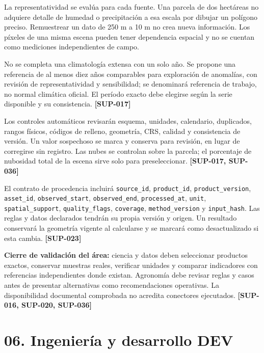 \documentclass[10pt,a4paper]{article}
\begin{document}
La representatividad se evalúa para cada fuente. Una parcela de dos hectáreas no adquiere detalle de humedad o precipitación a esa escala por dibujar un polígono preciso. Remuestrear un dato de 250 m a 10 m no crea nueva información. Los píxeles de una misma escena pueden tener dependencia espacial y no se cuentan como mediciones independientes de campo.


No se completa una climatología extensa con un solo año. Se propone una referencia de al menos diez años comparables para exploración de anomalías, con revisión de representatividad y sensibilidad; se denominará referencia de trabajo, no normal climática oficial. El período exacto debe elegirse según la serie disponible y su consistencia. \textbf{[SUP-017]}


Los controles automáticos revisarán esquema, unidades, calendario, duplicados, rangos físicos, códigos de relleno, geometría, CRS, calidad y consistencia de versión. Un valor sospechoso se marca y conserva para revisión, en lugar de corregirse sin registro. Las nubes se controlan sobre la parcela; el porcentaje de nubosidad total de la escena sirve solo para preseleccionar. \textbf{[SUP-017, SUP-036]}


El contrato de procedencia incluirá \texttt{source\_\allowbreak{}id}, \texttt{product\_\allowbreak{}id}, \texttt{product\_\allowbreak{}version}, \texttt{asset\_\allowbreak{}id}, \texttt{observed\_\allowbreak{}start}, \texttt{observed\_\allowbreak{}end}, \texttt{processed\_\allowbreak{}at}, \texttt{unit}, \texttt{spatial\_\allowbreak{}support}, \texttt{quality\_\allowbreak{}flags}, \texttt{coverage}, \texttt{method\_\allowbreak{}version} y \texttt{input\_\allowbreak{}hash}. Las reglas y datos declarados tendrán su propia versión y origen. Un resultado conservará la geometría vigente al calcularse y se marcará como desactualizado si esta cambia. \textbf{[SUP-023]}


\textbf{Cierre de validación del área:} ciencia y datos deben seleccionar productos exactos, conservar muestras reales, verificar unidades y comparar indicadores con referencias independientes donde existan. Agronomía debe revisar reglas y casos antes de presentar alternativas como recomendaciones operativas. La disponibilidad documental comprobada no acredita conectores ejecutados. \textbf{[SUP-016, SUP-020, SUP-036]}


\clearpage\section{06. Ingeniería y desarrollo DEV}\label{06-ingeniería-y-desarrollo-dev}
\end{document}
